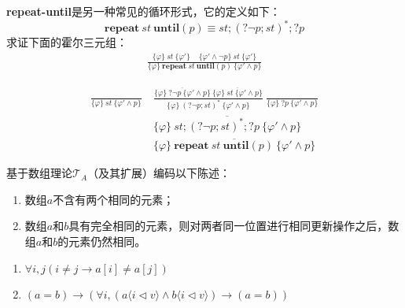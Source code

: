 \documentclass[11pt,a4paper]{article}
\begin{document}
\subproblem \textbf{repeat-until}是另一种常见的循环形式，它的定义如下：
$$\textbf{repeat}\ st\ \textbf{until}(p)\equiv st;(?\neg p;st)^*;?p$$
求证下面的霍尔三元组：
\begin{align*}
    \frac{
        \{\varphi\}\ st\ \{\varphi'\} \;\;\;\;
        \{\varphi'\wedge\neg p\}\ st\ \{\varphi'\}
    }{\{\varphi\}\ \textbf{repeat}\ st\ \textbf{until}(p)\ \{\varphi'\wedge p\}}
\end{align*}
\begin{solution}
    \begin{align*}
    	\frac{}{\{\varphi\}\ st\ \{\varphi'\wedge p\}}\ &\frac{\overline{\{\varphi\}\ ?\neg p\ \{\varphi'\wedge p\}}\ \overline{\{\varphi\}\ st\ \{\varphi'\wedge p\}}}{\{\varphi\}\ (?\neg p;st)^*\ \{\varphi'\wedge p\}}\ \frac{}{\{\varphi\}\ ?p\ \{\varphi'\wedge p\}}\\
    	&\overline{\{\varphi\}\ st;(?\neg p;st)^*;?p\ \{\varphi'\wedge p\}} \\
    	&\overline{\{\varphi\}\ \textbf{repeat}\ st\ \textbf{until}(p)\ \{\varphi'\wedge p\}}
    \end{align*}\end{solution}

\newpage
{}
\subproblem 基于数组理论$\mathcal{T}_A$（及其扩展）编码以下陈述：
\begin{enumerate}
	\item 数组$a$不含有两个相同的元素；
    \item 数组$a$和$b$具有完全相同的元素，则对两者同一位置进行相同更新操作之后，数组$a$和$b$的元素仍然相同。
\end{enumerate}

\begin{solution}
    \begin{enumerate}
	    \item $\forall i ,j (i \neq j \rightarrow a[i]\neq a[j])$
    	\item $(a=b)\rightarrow(\forall i, (a\langle{i\triangleleft v}\rangle \land b\langle{i\triangleleft v}\rangle)\rightarrow (a=b))$
	\end{enumerate}
\end{solution}
\end{document}
